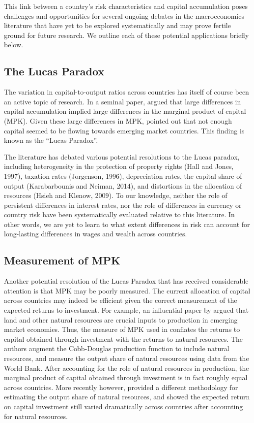 \documentclass{ar-1col}
\begin{document}
This link between a country's risk characteristics and capital accumulation poses challenges and opportunities for several ongoing debates in the macroeconomics literature that have yet to be explored systematically and may prove fertile ground for future research. We outline each of these potential applications briefly below.

\subsection{The Lucas Paradox}

The variation in capital-to-output ratios across countries has itself of course been an active topic of research. In a seminal paper, \citet{Lucas1990} argued that large differences in capital accumulation implied large differences in the marginal product of capital (MPK). Given these large differences in MPK, \citet{Lucas1990} pointed out that not enough capital seemed to be flowing towards emerging market countries. This finding is known as the ``Lucas Paradox''.

The literature has debated various potential resolutions to the Lucas paradox, including heterogeneity
in the protection of property rights (Hall and Jones, 1997), taxation rates (Jorgenson,
1996), depreciation rates, the capital share of output (Karabarbounis and Neiman, 2014),
and distortions in the allocation of resources (Hsieh and Klenow, 2009). To our knowledge, neither the role of persistent differences in interest rates, nor the role of differences in currency or country risk have been systematically evaluated relative to this literature. In other words, we are yet to learn to what extent differences in risk can account for long-lasting differences in wages and wealth across countries. 

\subsection{Measurement of MPK}

Another potential resolution of the Lucas Paradox that has received considerable attention is that MPK may be poorly measured. The current allocation of capital across countries may indeed be efficient given the correct measurement of the expected returns to investment. For example, an influential paper by \citet{CaselliFeyrer2007} argued that land and other natural resources are crucial inputs to production in emerging market economies. Thus, the measure of MPK used in \citet{Lucas1990} conflates the returns to capital obtained through investment with the returns to natural resources. The authors augment the Cobb-Douglas production function to include natural resources, and measure the output share of natural resources using data from the World Bank. After accounting for the role of natural resources in production, the marginal product of capital obtained through investment is in fact roughly equal across countries. More recently however, \citet{Monge-Naranjoetal2019} provided a different methodology for estimating the output share of natural resources, and showed the expected return on capital investment still varied dramatically across countries after accounting for natural resources.
\end{document}
